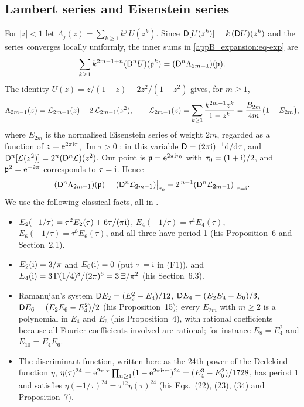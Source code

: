 \subsection{Lambert series and Eisenstein series}

For $|z|<1$ let $\Lambda_{j}(z)=\sum_{k\ge1}k^{j}\,U(z^{k})$. Since $\mathsf{D}[U(z^{k})]=k\,(\mathsf{D} U)(z^{k})$ and the
series converges locally uniformly, the inner sums in \eqref{appB_expansion:eq-exp} are
\begin{equation}\label{appB_expansion:eq-bm}
  \sum_{k\ge1}k^{2m-1+n}(\mathsf{D}^{n}U)(\mathfrak{p}^{k})=(\mathsf{D}^{n}\Lambda_{2m-1})(\mathfrak{p}).
\end{equation}
The identity $U(z)=z/(1-z)-2z^{2}/(1-z^{2})$ gives, for $m\ge1$,
\begin{equation}\label{appB_expansion:eq-lambert}
  \Lambda_{2m-1}(z)=\mathcal{L}_{2m-1}(z)-2\,\mathcal{L}_{2m-1}(z^{2}),\qquad
  \mathcal{L}_{2m-1}(z)=\sum_{k\ge1}\frac{k^{2m-1}z^{k}}{1-z^{k}}=\frac{B_{2m}}{4m}\bigl(1-E_{2m}\bigr),
\end{equation}
where $E_{2m}$ is the normalised Eisenstein series of weight $2m$, regarded as a function of $z=\mathrm{e}^{2\pi\mathrm{i}\tau}$,
$\operatorname{Im}\tau>0$ \citep[Proposition~5 and Eq.~(17)]{Zagier2008}; in this variable $\mathsf{D}=(2\pi\mathrm{i})^{-1}\mathrm{d}/\mathrm{d}\tau$,
and $\mathsf{D}^{n}[\mathcal{L}(z^{2})]=2^{n}(\mathsf{D}^{n}\mathcal{L})(z^{2})$. Our point is $\mathfrak{p}=\mathrm{e}^{2\pi\mathrm{i}\tau_0}$ with
$\tau_0=(1+\mathrm{i})/2$, and $\mathfrak{p}^{2}=\mathrm{e}^{-2\pi}$ corresponds to $\tau=\mathrm{i}$. Hence
\begin{equation}\label{appB_expansion:eq-two-points}
  (\mathsf{D}^{n}\Lambda_{2m-1})(\mathfrak{p})=(\mathsf{D}^{n}\mathcal{L}_{2m-1})\big|_{\tau_0}-2^{\,n+1}(\mathsf{D}^{n}\mathcal{L}_{2m-1})\big|_{\tau=\mathrm{i}}.
\end{equation}
We use the following classical facts, all in \citet{Zagier2008}.
\begin{itemize}
\item[(F1)] $E_2(-1/\tau)=\tau^{2}E_2(\tau)+6\tau/(\pi\mathrm{i})$, $E_4(-1/\tau)=\tau^{4}E_4(\tau)$,
$E_6(-1/\tau)=\tau^{6}E_6(\tau)$, and all three have period 1 (his Proposition~6 and Section~2.1).
\item[(F2)] $E_2(\mathrm{i})=3/\pi$ and $E_6(\mathrm{i})=0$ (put $\tau=\mathrm{i}$ in (F1)), and
$E_4(\mathrm{i})=3\,\Gamma(1/4)^{8}/(2\pi)^{6}=3\,\Xi/\pi^{2}$ (his Section~6.3).
\item[(F3)] Ramanujan's system $\mathsf{D} E_2=(E_2^{2}-E_4)/12$, $\mathsf{D} E_4=(E_2E_4-E_6)/3$,
$\mathsf{D} E_6=(E_2E_6-E_4^{2})/2$ (his Proposition~15); every $E_{2m}$ with $m\ge2$ is a polynomial in $E_4$ and
$E_6$ (his Proposition~4), with rational coefficients because all Fourier coefficients involved are rational;
for instance $E_8=E_4^{2}$ and $E_{10}=E_4E_6$.
\item[(F4)] The discriminant function, written here as the 24th power of the Dedekind function $\eta$,
$\eta(\tau)^{24}=\mathrm{e}^{2\pi\mathrm{i}\tau}\prod_{n\ge1}(1-\mathrm{e}^{2\pi\mathrm{i} n\tau})^{24}=(E_4^{3}-E_6^{2})/1728$, has
period 1 and satisfies $\eta(-1/\tau)^{24}=\tau^{12}\eta(\tau)^{24}$ (his Eqs.~(22), (23), (34) and Proposition~7).
\end{itemize}
